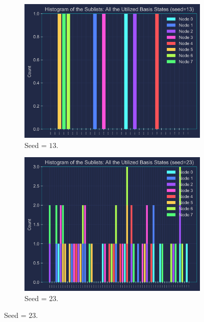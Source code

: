\begin{figure}[hb!]
  \centering
  \begin{subfigure}[t]{0.495\textwidth}
      \centering
      \includegraphics[width=1\textwidth]{Figures/Chapter_5/Random iQAQE (Coloured plots)/8-node(seed=13).png}
      \caption{Seed = $13$.}
      \label{fig:seed=13}
  \end{subfigure}
  \hfill
  \begin{subfigure}[t]{0.495\textwidth}
      \centering
      \includegraphics[width=1\textwidth]{Figures/Chapter_5/Random iQAQE (Coloured plots)/8-node(seed=23).png}
      \caption{Seed = $23$.}
      \label{fig:seed=23}
  \end{subfigure}
\end{figure}

